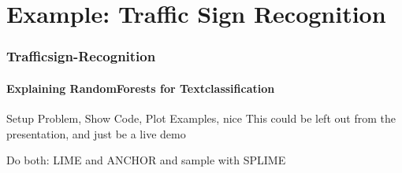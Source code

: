 \section{Example: Traffic Sign Recognition}

\begin{frame}
	\frametitle{Trafficsign-Recognition}
	\framesubtitle{Explaining RandomForests for Textclassification}
	Setup Problem, Show Code, Plot Examples, nice
	This could be left out from the presentation, and just be a live demo
	
	
	Do both: LIME and ANCHOR and sample with SPLIME
\end{frame}